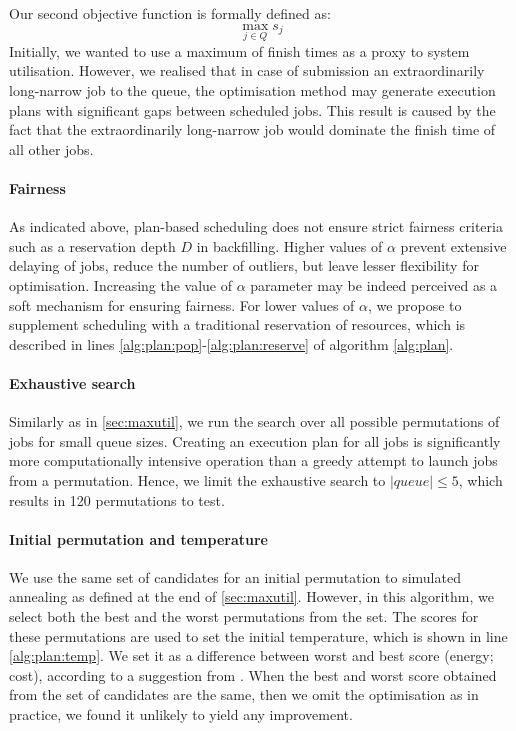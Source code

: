 \documentclass[thesis-en.tex]{subfiles}
\begin{document}
Our second objective function is formally defined as:
\[ \max_{j \in  Q} s_j \]
Initially, we wanted to use a maximum of finish times as a proxy to system utilisation. However, we realised that in case of submission an extraordinarily long-narrow job to the queue, the optimisation method may generate execution plans with significant gaps between scheduled jobs. This result is caused by the fact that the extraordinarily long-narrow job would dominate the finish time of all other jobs.

\paragraph{Fairness}
As indicated above, plan-based scheduling does not ensure strict fairness criteria such as a reservation depth $D$ in backfilling. Higher values of $\alpha$ prevent extensive delaying of jobs, reduce the number of outliers, but leave lesser flexibility for optimisation. Increasing the value of $\alpha$ parameter may be indeed perceived as a soft mechanism for ensuring fairness. For lower values of $\alpha$, we propose to supplement scheduling with a traditional reservation of resources, which is described in lines \ref{alg:plan:pop}-\ref{alg:plan:reserve} of algorithm \ref{alg:plan}.

\paragraph{Exhaustive search}
Similarly as in \autoref{sec:maxutil}, we run the search over all possible permutations of jobs for small queue sizes. Creating an execution plan for all jobs is significantly more computationally intensive operation than a greedy attempt to launch jobs from a permutation. Hence, we limit the exhaustive search to $|queue| \leq 5$, which results in 120 permutations to test.

\paragraph{Initial permutation and temperature}
We use the same set of candidates for an initial permutation to simulated annealing as defined at the end of \autoref{sec:maxutil}. However, in this algorithm, we select both the best and the worst permutations from the set. The scores for these permutations are used to set the initial temperature, which is shown in line \ref{alg:plan:temp}. We set it as a difference between worst and best score (energy; cost), according to a suggestion from \cite{10.1023/B:COAP.0000044187.23143.bd}. When the best and worst score obtained from the set of candidates are the same, then we omit the optimisation as in practice, we found it unlikely to yield any improvement.
\end{document}

